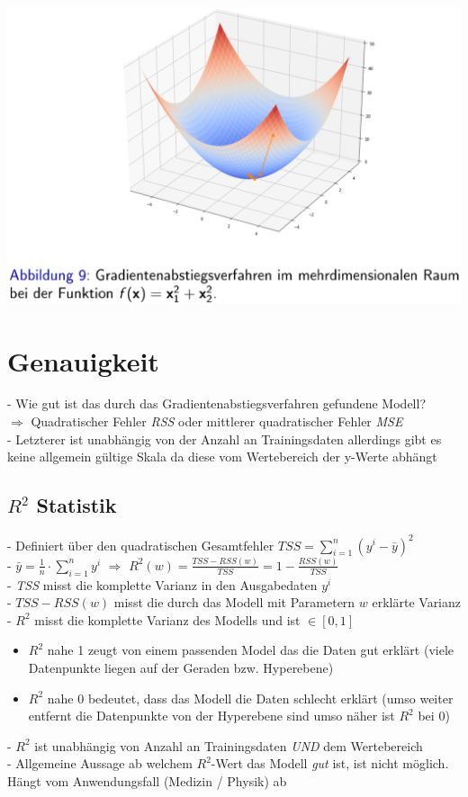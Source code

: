 \documentclass{report}
\begin{document}
  \begin{center}	
    \includegraphics[scale=.25]{ml02_5}	
  \end{center}	
  
  \section{Genauigkeit}	
  - Wie gut ist das durch das Gradientenabstiegsverfahren gefundene Modell?\\	
  $\Rightarrow$ Quadratischer Fehler \textit{RSS} oder mittlerer quadratischer Fehler \textit{MSE}\\	
  - Letzterer ist unabhängig von der Anzahl an Trainingsdaten allerdings gibt es keine allgemein gültige Skala da diese vom Wertebereich der y-Werte abhängt	
  
  \subsection{$R^2$ Statistik}	
  - Definiert über den quadratischen Gesamtfehler $TSS = \sum_{i=1}^n(y^i - \bar{y})^2$\\	
  - $\bar{y} = \frac{1}{n}\cdot \sum_{i=1}^ny^i$ $\Rightarrow$ $R^2(w) = \frac{TSS - RSS(w)}{TSS} = 1 - \frac{RSS(w)}{TSS}$\\	
  - \textit{TSS} misst die komplette Varianz in den Ausgabedaten $y^i$\\	
  - $TSS - RSS(w)$ misst die durch das Modell mit Parametern $w$ erklärte Varianz\\	
  - $R^2$ misst die komplette Varianz des Modells und ist $\in [0, 1]$\\	
  \vspace*{-1.25em}	
  \begin{itemize}	
    \item $R^2$ nahe 1 zeugt von einem passenden Model das die Daten gut erklärt (viele Datenpunkte liegen auf der Geraden bzw. Hyperebene)	
    \item $R^2$ nahe 0 bedeutet, dass das Modell die Daten schlecht erklärt (umso weiter entfernt die Datenpunkte von der Hyperebene sind umso näher ist $R^2$ bei 0)	
  \end{itemize}	
  - $R^2$ ist unabhängig von Anzahl an Trainingsdaten \textit{UND} dem Wertebereich\\	
  - Allgemeine Aussage ab welchem $R^2$-Wert das Modell \textit{gut} ist, ist nicht möglich. Hängt vom Anwendungsfall (Medizin / Physik) ab	
  
\end{document}
